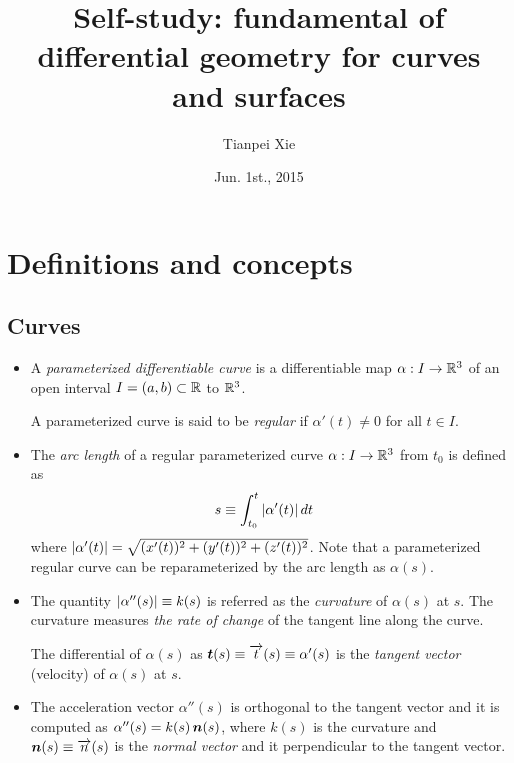 \documentclass[11pt]{article}
\begin{document}
\title{Self-study: fundamental of differential geometry for curves and surfaces}
\author{ Tianpei Xie}
\date{ Jun. 1st., 2015 }
\maketitle
\tableofcontents
\newpage
\section{Definitions and concepts}
\subsection{Curves}
\begin{itemize}
\item \begin{definition}
A \emph{parameterized differentiable curve} \citep{do1976differential} is a differentiable map $\alpha: I \rightarrow {\mathbb R}^{3}$ of an open interval $I = (a,b) \subset {\mathbb R}$ to ${\mathbb R}^{3}$. 

 A parameterized curve is said to be \emph{regular} if $\alpha'(t)\neq 0$ for all $t\in I$.
\end{definition}

\item The \emph{arc length} of a regular parameterized curve $\alpha: I \rightarrow {\mathbb R}^{3}$ from $t_{0}$ is defined as
\begin{align*}
s &\equiv \int_{t_{0}}^{t}\left\lvert \alpha'(t) \right\rvert dt 
\end{align*} where $\left\lvert \alpha'(t) \right\rvert = \sqrt{(x'(t))^{2} + (y'(t))^{2}+ (z'(t))^{2}}$. Note that a parameterized regular curve can be reparameterized by the arc length as $\alpha(s)$.

\item   \begin{definition}
The quantity $\left\lvert \alpha''(s) \right\rvert \equiv k(s)$ is referred as the \emph{curvature} of $\alpha(s)$ at $s$. The curvature measures \emph{the rate of change} of the tangent line along the curve. 

 The differential of $\alpha(s)$ as $\boldsymbol{t}(s) \equiv \overrightarrow{t}(s) \equiv \alpha'(s)$ is the \emph{tangent vector} (velocity) of $\alpha(s)$ at $s$. 
\end{definition}

\item The acceleration vector $\alpha''(s)$ is orthogonal to the tangent vector and it is computed as $\alpha''(s) = k(s)\,\boldsymbol{n}(s)$, where $k(s)$ is the curvature and $\boldsymbol{n}(s) \equiv \overrightarrow{n}(s)$ is the \emph{normal vector} and it perpendicular to the tangent vector. 


\end{itemize}
\end{document}
